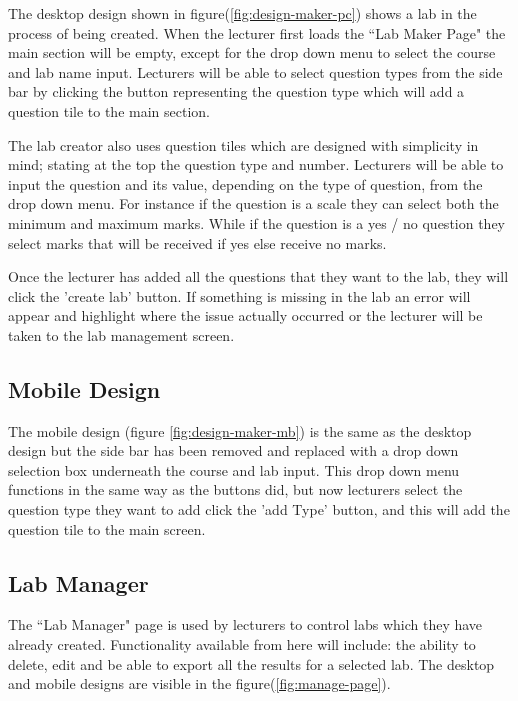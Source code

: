 \documentclass[11pt]{report}
\begin{document}
The desktop design shown in figure(\ref{fig:design-maker-pc}) shows a lab in the process of being created. When the lecturer first loads the ``Lab Maker Page" the main section will be empty, except for the drop down menu to select the course and lab name input. Lecturers will be able to select question types from the side bar by clicking the button representing the question type which will add a question tile to the main section. 

The lab creator also uses question tiles which are designed with simplicity in mind; stating at the top the question type and number. Lecturers will be able to input the question and its value, depending on the type of question, from the drop down menu. For instance if the question is a scale they can select both the minimum and maximum marks. While if the question is a yes / no question they select marks that will be received if yes else receive no marks. 

Once the lecturer has added all the questions that they want  to the lab, they will click the 'create lab' button. If something is missing in the lab an error will appear and highlight where the issue actually  occurred or the lecturer will be taken to the lab management screen.


\subsection*{Mobile Design}


The mobile design (figure \ref{fig:design-maker-mb}) is the same as the desktop design but the side bar has been removed and replaced with a drop down selection box underneath the course and lab input. This drop down menu functions in the same way as the buttons did, but now lecturers select the question type they want to add click the 'add Type' button, and this will add the question tile to the main screen.


\subsection{Lab Manager}
The ``Lab Manager" page is used by lecturers to control labs which they have already created. Functionality available from here will include: the ability to delete, edit and be able to export all the results for a selected lab. The desktop and mobile designs are visible in the figure(\ref{fig:manage-page}). 
\end{document}
